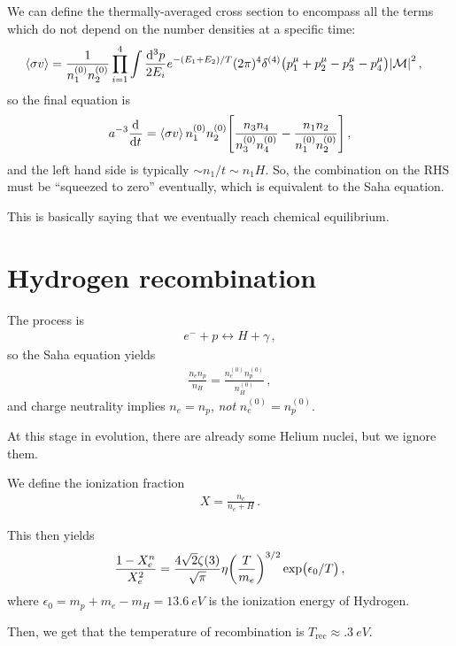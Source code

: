 \documentclass[main.tex]{subfiles}
\begin{document}
We can define the thermally-averaged cross section to encompass all the terms which do not depend on the number densities at a specific time: 
%
\begin{align}
\expval{\sigma v} &= \frac{1}{n_1^{(0)} n_2^{(0)}}
\prod_{i=1}^{4} \int \frac{ \dd[3]{p}}{2 E_i} 
e^{- (E_1 + E_2 ) / T} 
(2 \pi )^{4} \delta^{(4)} \qty(p^{\mu }_{1} + p^{\mu }_{2} - p^{\mu }_{3} - p^{\mu }_{4}) \abs{\mathcal{M}}^2
\,,
\end{align}
%
so the final equation is 
%
\begin{align}
a^{-3} \dv[]{}{t} (n_1 a^3)
= \expval{\sigma v} n_1^{(0)} n_2^{(0)} \qty[
\frac{n_3 n_4 }{n_3^{(0)} n_4^{(0)}}
- 
\frac{n_1 n_2 }{n_1^{(0)} n_2^{(0)}}]
\,,
\end{align}
%
and the left hand side is typically \(\sim n_1 / t \sim n_1 H\). So, the combination on the RHS must be ``squeezed to zero'' eventually, which is equivalent to the Saha equation. 

This is basically saying that we eventually reach chemical equilibrium. 

\section{Hydrogen recombination}

The process is 
%
\begin{align}
e^{-} + p \leftrightarrow H + \gamma 
\,,
\end{align}
%
so the Saha equation yields 
%
\begin{align}
\frac{n_e n_p}{n_H} = \frac{n_e^{(0)} n_p^{(0)}}{n_H^{(0)}}
\,,
\end{align}
%
and charge neutrality implies \(n_e = n_p\), \emph{not} \(n_e^{(0)} = n_p^{(0)}\). 

At this stage in evolution, there are already some Helium nuclei, but we ignore them. 

We define the ionization fraction 
%
\begin{align}
X = \frac{n_e}{n_e + H}
\,.
\end{align}

This then yields 
%
\begin{align}
\frac{1 - X_e^{n}}{X_e^{2}} = \frac{4 \sqrt{2} \zeta (3)}{\sqrt{\pi }} \eta \qty(\frac{T}{m_e})^{3/2} \exp(\epsilon_{0} / T)
\,,
\end{align}
%
where \(\epsilon_0 = m_p + m_e - m_H = \SI{13.6}{eV}\) is the ionization energy of Hydrogen. 

Then, we get that the temperature of recombination is \(T _{\text{rec}} \approx \SI{.3}{eV}\). 
\end{document}
